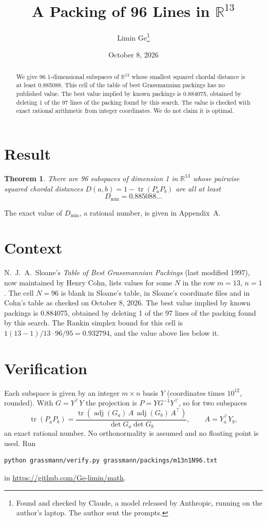 \documentclass[11pt,a4paper]{article}
\title{A Packing of 96 Lines in $\mathbb{R}^{13}$}
\author{Limin Ge\thanks{Found and checked by Claude, a model released by Anthropic, running on the author's laptop. The author sent the prompts.}}
\date{October 8, 2026}
\newtheorem*{theorem}{Theorem}
\begin{document}
\maketitle
\begin{abstract}
We give 96 1-dimensional subspaces of $\mathbb{R}^{13}$ whose smallest squared chordal distance is at least 0.885088. This cell of the table of best Grassmannian packings has no published value. The best value implied by known packings is 0.884075, obtained by deleting 1 of the 97 lines of the packing found by this search. The value is checked with exact rational arithmetic from integer coordinates. We do not claim it is optimal.
\end{abstract}

\section{Result}
\begin{theorem}
There are 96 subspaces of dimension 1 in $\mathbb{R}^{13}$ whose pairwise squared chordal distances $D(a,b) = 1 - \operatorname{tr}(P_aP_b)$ are all at least
\[ D_{\min} = 0.885088\ldots \]
\end{theorem}
The exact value of $D_{\min}$, a rational number, is given in Appendix~A.


\section{Context}
N.~J.~A.~Sloane's \emph{Table of Best Grassmannian Packings} (last modified 1997), now maintained by Henry Cohn, lists values for some $N$ in the row $m=13$, $n=1$. The cell $N=96$ is blank in Sloane's table, in Sloane's coordinate files and in Cohn's table as checked on October 8, 2026. The best value implied by known packings is 0.884075, obtained by deleting 1 of the 97 lines of the packing found by this search. The Rankin simplex bound for this cell is $1(13-1)/13\cdot 96/95 = 0.932794$, and the value above lies below it.


\section{Verification}
Each subspace is given by an integer $m\times n$ basis $Y$ (coordinates times $10^{12}$, rounded). With $G=Y^\top Y$ the projection is $P=YG^{-1}Y^\top$, so for two subspaces
\[ \operatorname{tr}(P_aP_b)=\frac{\operatorname{tr}(\operatorname{adj}(G_a)\,A\,\operatorname{adj}(G_b)\,A^\top)}{\det G_a\det G_b},\qquad A=Y_a^\top Y_b, \]
an exact rational number. No orthonormality is assumed and no floating point is used. Run
\begin{verbatim}
python grassmann/verify.py grassmann/packings/m13n1N96.txt
\end{verbatim}
in \url{https://github.com/Ge-limin/math}.
\end{document}
